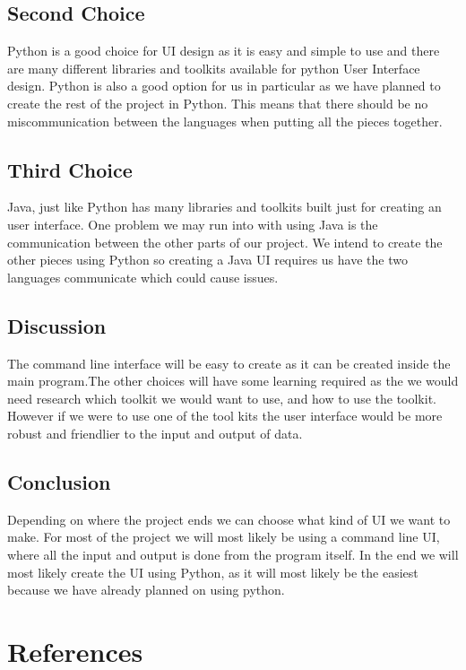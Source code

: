 \documentclass[10pt, draftclsnofoot, onecolumn]{IEEEtran}
\begin{document}
	\subsection{Second Choice}
	Python is a good choice for UI design as it is easy and simple to use and there are many different libraries and toolkits available for python User Interface design. Python is also a good option for us in particular as we have planned to create the rest of the project in Python. This means that there should be no miscommunication between the languages when putting all the pieces together.
	\subsection{Third Choice}
	Java, just like Python has many libraries and toolkits built just for creating an user interface. One problem we may run into with using Java is the communication between the other parts of our project. We intend to create the other pieces using Python so creating a Java UI requires us have the two languages communicate which could cause issues.
	\subsection{Discussion}
	The command line interface will be easy to create as it can be created inside the main program.The other choices will have some learning required as the we would need research which toolkit we would want to use, and how to use the toolkit. However if we were to use one of the tool kits the user interface would be more robust and friendlier to the input and output of data.
	\subsection{Conclusion}		
	Depending on where the project ends we can choose what kind of UI we want to make. For most of the project we will most likely be using a command line UI, where all the input and output is done from the program itself. In the end we will most likely create the UI using Python, as it will most likely be the easiest because we have already planned on using python.
\section*{References}
\end{document}
